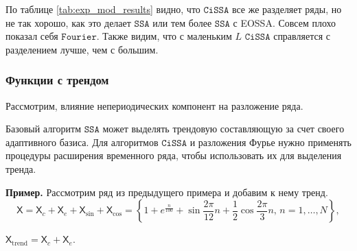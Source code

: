 \documentclass[12pt, specialist, subf
]{disser}
\theoremstyle{definition}
\newcommand{\SSA}{\texttt{SSA}}
\newcommand{\CISSA}{\texttt{CiSSA}}
\newcommand{\FOURIER}{\texttt{Fourier}}
\newcommand{\TS}{\mathsf{X}}
\begin{document}
По таблице \ref{tab:exp_mod_results} видно, что $\CISSA$ все же разделяет ряды, но не так хорошо, как это делает $\SSA$ или тем более $\SSA$ с EOSSA. Совсем плохо показал себя $\FOURIER$. Также видим, что с маленьким $L$ $\CISSA$ справляется с разделением лучше, чем с большим.


\subsubsection{Функции с трендом}



\label{subsubsec:trend}

Рассмотрим, влияние непериодических компонент на разложение ряда.

Базовый алгоритм $\SSA$ может выделять трендовую составляющую за счет своего адаптивного базиса. Для алгоритмов $\CISSA$ и разложения Фурье нужно применять процедуры расширения временного ряда, чтобы использовать их для выделения тренда.

\textbf{\large{Пример.}} Рассмотрим ряд из предыдущего примера и добавим к нему тренд. \[
\TS = \TS_{c} + \TS_e + \TS_{\sin} + \TS_{\cos} = 
\left\{
	1 + e^{\frac{n}{100}} + \sin{\frac{2\pi}{12}n} + \frac{1}{2}\cos{\frac{2\pi}{3}n}, \, n = 1, \dots, N
\right\}, \]

$\TS_{\mathrm{trend}} = \TS_{c} + \TS_e$.
\end{document}

